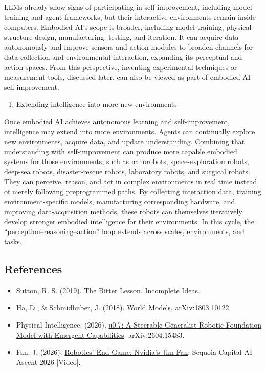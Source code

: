 LLMs already show signs of participating in self-improvement, including model training and agent frameworks, but their interactive environments remain inside computers. Embodied AI's scope is broader, including model training, physical-structure design, manufacturing, testing, and iteration. It can acquire data autonomously and improve sensors and action modules to broaden channels for data collection and environmental interaction, expanding its perceptual and action spaces. From this perspective, inventing experimental techniques or measurement tools, discussed later, can also be viewed as part of embodied AI self-improvement.

\begin{enumerate}
\def\labelenumi{\arabic{enumi}.}
\setcounter{enumi}{1}
\tightlist
\item
  Extending intelligence into more new environments
\end{enumerate}

Once embodied AI achieves autonomous learning and self-improvement, intelligence may extend into more environments. Agents can continually explore new environments, acquire data, and update understanding. Combining that understanding with self-improvement can produce more capable embodied systems for those environments, such as nanorobots, space-exploration robots, deep-sea robots, disaster-rescue robots, laboratory robots, and surgical robots. They can perceive, reason, and act in complex environments in real time instead of merely following preprogrammed paths. By collecting interaction data, training environment-specific models, manufacturing corresponding hardware, and improving data-acquisition methods, these robots can themselves iteratively develop stronger embodied intelligence for their environments. In this cycle, the ``perception--reasoning--action'' loop extends across scales, environments, and tasks.

\FloatBarrier
{}
\hypertarget{references-166}{%
\subsection{References}\label{references-166}}

\vspace{0.25em}
\begin{itemize}
\tightlist
\item
  Sutton, R. S. (2019). \href{http://www.incompleteideas.net/IncIdeas/BitterLesson.html}{The Bitter Lesson}. Incomplete Ideas.
\item
  Ha, D., \& Schmidhuber, J. (2018). \href{https://arxiv.org/abs/1803.10122}{World Models}. arXiv:1803.10122.
\item
  Physical Intelligence. (2026). \href{https://arxiv.org/abs/2604.15483}{π0.7: A Steerable Generalist Robotic Foundation Model with Emergent Capabilities}. arXiv:2604.15483.
\item
  Fan, J. (2026). \href{https://www.youtube.com/watch?v=3Y8aq_ofEVs}{Robotics' End Game: Nvidia's Jim Fan}. Sequoia Capital AI Ascent 2026 {[}Video{]}.
\end{itemize}

\clearpage
